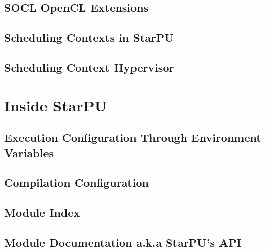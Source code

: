 \documentclass{book}
\begin{document}
\chapter{SOCL OpenCL Extensions}
\label{soclOpenclExtensions}
\hypertarget{soclOpenclExtensions}{}


\chapter{Scheduling Contexts in StarPU}
\label{schedulingContexts}
\hypertarget{schedulingContexts}{}


\chapter{Scheduling Context Hypervisor}
\label{schedulingContextHypervisor}
\hypertarget{schedulingContextHypervisor}{}


\part{Inside StarPU}

\chapter{Execution Configuration Through Environment Variables}
\label{EnvironmentVariables}
\hypertarget{EnvironmentVariables}{}


\chapter{Compilation Configuration}
\label{ConfigureOptions}
\hypertarget{ConfigureOptions}{}


\chapter{Module Index}


\chapter{Module Documentation a.k.a StarPU's API}


















\end{document}
